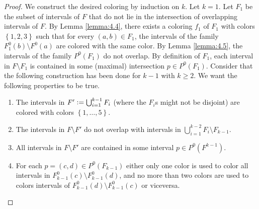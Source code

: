 \documentclass[12pt]{article}
\theoremstyle{definition}
\newcommand{\defeq}{\vcentcolon=}
\begin{document}
    \begin{proof}
        We construct the desired
        coloring by induction
        on $k$.
        Let $k = 1$.
        Let $F_1$ be the subset
        of intervals of $F$ that 
        do not lie in the intersection
        of overlapping intervals of $F$.
        By Lemma \ref{lemma:4.4},
        there exists a coloring
        $f_1$ of $F_1$ with colors
        $\left\{1,2,3\right\}$ such
        that for every $\left(a,b\right)
        \in F_1$, the intervals
        of the family $F^{0}_{1}
        \left(b\right) \setminus F^{0}\left(a\right)$
        are colored with the same
        color.
        By Lemma \ref{lemma:4.5},
        the intervals of the family
        $P^{0}\left(F_1\right)$ 
        do not overlap. By definition
        of $F_1$, each interval in 
        $F \setminus F_1$ is contained
        in some (maximal) intersection
        $p \in P^{0}\left(F_1\right)$.
        Consider that the following
        construction has been done
        for $k - 1$ with $k \geq 2$.
        We want the following properties
        to be true.
        \begin{enumerate}
            \item The intervals in
                $F' \defeq 
                \bigcup_{i=1}^{k-1} F_{i}$
                (where the $F_{i}$s
                might not be disjoint)
                are colored with colors
                $\left\{1, \ldots, 5\right\}$.
            \item The intervals in
                $F \setminus F'$ do not
                overlap with intervals
                in $\bigcup_{i=1}^{k-2}
                F_{i} \setminus F_{k-1}$.
                \label{cond:2}
            \item \label{cond:3} All intervals in 
                $F \setminus F'$ 
                are contained in some 
                interval $p \in 
                P^{0}\left(F^{k-1}\right)$.
            \item For each $p =
                \left(c, d\right) \in 
                P^{0}\left(F_{k-1}\right)$ 
                either only one
                color is used to color
                all intervals in 
                $F^{0}_{k-1}\left(c\right) 
                \setminus F^{0}_{k-1}\left(d\right)$,
                and no more than 
                two colors are used to 
                colors intervals
                of $F^{0}_{k-1}\left(d\right)
                \setminus F^{0}_{k-1}\left(c\right)$
                or viceversa.
        \end{enumerate}

\end{proof}
\end{document}
